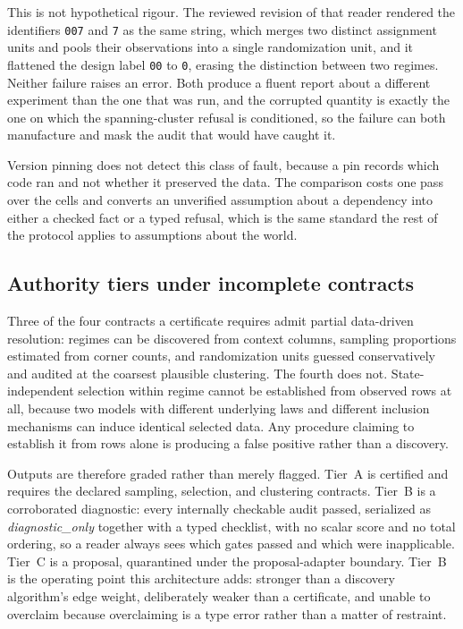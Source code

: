 \documentclass[11pt]{article}
\begin{document}
This is not hypothetical rigour. The reviewed revision of that reader rendered
the identifiers \texttt{007} and \texttt{7} as the same string, which merges two
distinct assignment units and pools their observations into a single
randomization unit, and it flattened the design label \texttt{00} to
\texttt{0}, erasing the distinction between two regimes. Neither failure raises
an error. Both produce a fluent report about a different experiment than the
one that was run, and the corrupted quantity is exactly the one on which the
spanning-cluster refusal is conditioned, so the failure can both manufacture
and mask the audit that would have caught it.

Version pinning does not detect this class of fault, because a pin records
which code ran and not whether it preserved the data. The comparison costs one
pass over the cells and converts an unverified assumption about a dependency
into either a checked fact or a typed refusal, which is the same standard the
rest of the protocol applies to assumptions about the world.

\subsection{Authority tiers under incomplete contracts}

Three of the four contracts a certificate requires admit partial data-driven
resolution: regimes can be discovered from context columns, sampling
proportions estimated from corner counts, and randomization units guessed
conservatively and audited at the coarsest plausible clustering. The fourth
does not. State-independent selection within regime cannot be established from
observed rows at all, because two models with different underlying laws and
different inclusion mechanisms can induce identical selected data. Any
procedure claiming to establish it from rows alone is producing a false
positive rather than a discovery.

Outputs are therefore graded rather than merely flagged. Tier~A is certified
and requires the declared sampling, selection, and clustering contracts.
Tier~B is a corroborated diagnostic: every internally checkable audit passed,
serialized as \emph{diagnostic\_only} together with a typed checklist, with no
scalar score and no total ordering, so a reader always sees which gates passed
and which were inapplicable. Tier~C is a proposal, quarantined under the
proposal-adapter boundary. Tier~B is the operating point
this architecture adds: stronger than a discovery algorithm's edge weight,
deliberately weaker than a certificate, and unable to overclaim because
overclaiming is a type error rather than a matter of restraint.
\end{document}
